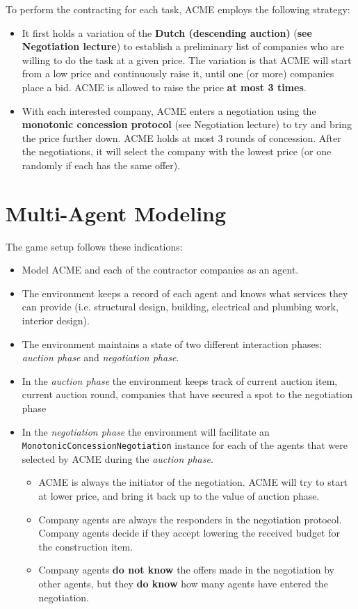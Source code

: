 \documentclass[a4paper, 12pt, twoside]{article}
\begin{document}
To perform the contracting for each task, ACME employs the following strategy:
\begin{itemize}
	\item It first holds a variation of the \textbf{Dutch (descending auction)} (\textbf{see Negotiation lecture}) to establish a preliminary list of companies who are willing to do the task at a given price. The variation is that ACME will start from a low price and continuously raise it, until one (or more) companies place a bid. ACME is allowed to raise the price \textbf{at most 3 times}. 

	\item With each interested company, ACME enters a negotiation using the \textbf{monotonic concession protocol} (see Negotiation lecture) to try and bring the price further down. ACME holds at most 3 rounds of concession. After the negotiations, it will select the company with the lowest price (or one randomly if each has the same offer).
\end{itemize}

\section{Multi-Agent Modeling}
%
The game setup follows these indications:
\begin{itemize}
	\item Model ACME and each of the contractor companies as an agent.
	\item The environment keeps a record of each agent and knows what services they can provide (i.e. structural design, building, electrical and plumbing work, interior design).
	\item The environment maintains a state of two different interaction phases: \textit{auction phase} and \textit{negotiation phase}. 
	\item In the \textit{auction phase} the environment keeps track of current auction item, current auction round, companies that have secured a spot to the negotiation phase
	\item In the \textit{negotiation phase} the environment will facilitate an \texttt{MonotonicConcessionNegotiation} instance for each of the agents that were selected by ACME during the \textit{auction phase}.
		\begin{itemize}
			\item ACME is always the initiator of the negotiation. ACME will try to start at lower price, and bring it back up to the value of auction phase.
			\item Company agents are always the responders in the negotiation protocol. Company agents decide if they accept lowering the received budget for the construction item.
			\item Company agents \textbf{do not know} the offers made in the negotiation by other agents, but they \textbf{do know} how many agents have entered the negotiation.
		\end{itemize}
	
\end{itemize}
\end{document}
